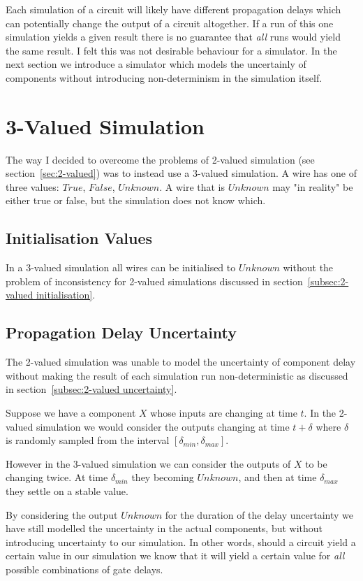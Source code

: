 Each simulation of a circuit will likely have different propagation delays which can potentially change the output of a circuit altogether. If a run of this one simulation yields a given result there is no guarantee that \textit{all} runs would yield the same result. I felt this was not desirable behaviour for a simulator. In the next section we introduce a simulator which models the uncertainly of components without introducing non-determinism in the simulation itself.

\section{3-Valued Simulation}
\label{sec:3-valued}
The way I decided to overcome the problems of 2-valued simulation (see section~\ref{sec:2-valued}) was to instead use a 3-valued simulation. A wire has one of three values: $True$, $False$, $Unknown$. A wire that is $Unknown$ may "in reality" be either true or false, but the simulation does not know which.

\subsection{Initialisation Values}
In a 3-valued simulation all wires can be initialised to $Unknown$ without the problem of inconsistency for 2-valued simulations discussed in section~\ref{subsec:2-valued initialisation}.

\subsection{Propagation Delay Uncertainty}
\label{subsec:3-valued uncertainty}
The 2-valued simulation was unable to model the uncertainty of component delay without making the result of each simulation run non-deterministic as discussed in section~\ref{subsec:2-valued uncertainty}.

Suppose we have a component $X$ whose inputs are changing at time $t$. In the 2-valued simulation we would consider the outputs changing at time $t + \delta$ where $\delta$ is randomly sampled from the interval $[\delta_{min}, \delta_{max}]$. 

However in the 3-valued simulation we can consider the outputs of $X$ to be changing twice. At time $\delta_{min}$ they becoming $Unknown$, and then at time $\delta_{max}$ they settle on a stable value. 

By considering the output $Unknown$ for the duration of the delay uncertainty we have still modelled the uncertainty in the actual components, but without introducing uncertainty to our simulation. In other words, should a circuit yield a certain value in our simulation we know that it will yield a certain value for \textit{all} possible combinations of gate delays.

